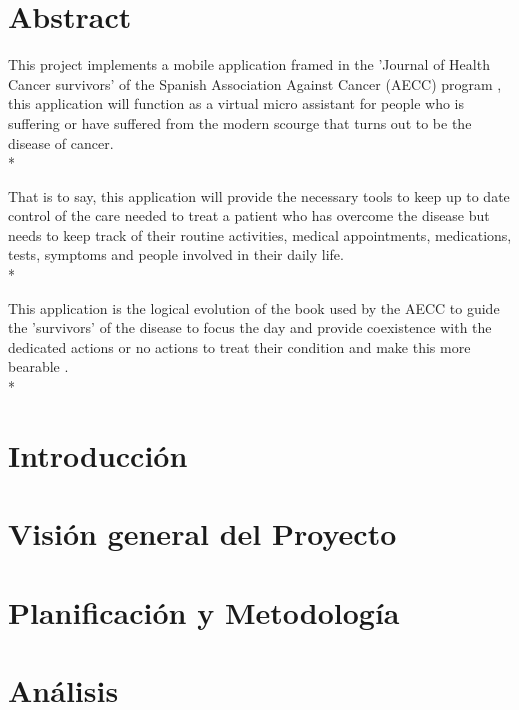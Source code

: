 \documentclass[b5paper,10pt,twoside]{book}
\begin{document}
	\chapter*{Abstract}
	 	This project implements a mobile application framed in the 'Journal of Health Cancer survivors' of the Spanish Association Against Cancer (AECC) program \cite{aecc}, this application will function as a virtual micro assistant for people who is suffering or have suffered from the modern scourge that turns out to be the disease of cancer.\\*
	 	
	 	That is to say, this application will provide the necessary tools to keep up to date control of the care needed to treat a patient who has overcome the disease but needs to keep track of their routine activities, medical appointments, medications, tests, symptoms and people involved in their daily life.\\*
	 	
	 	This application is the logical evolution of the book used by the AECC to guide the 'survivors' of the disease to focus the day and provide coexistence with the dedicated actions or no actions to treat their condition and make this more bearable \cite{SHAREESP}.\\*
	
	\tableofcontents
	
	\listoffigures
	
	\listoftables
	

	\chapter{Introducción}
	
	
	
	\chapter{Visión general del Proyecto}

	
	
	\chapter{Planificación y Metodología}
	
	
	
	\chapter{Análisis}
	
\end{document}
